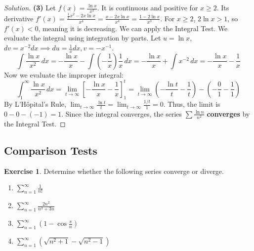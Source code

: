\documentclass[11pt]{article}
\theoremstyle{definition}
\newtheorem{exercise}{Exercise}[section]
\newenvironment{solution}{\begin{proof}[Solution]}{\end{proof}}
\begin{document}
\begin{solution}
\textbf{(3)} Let $f(x) = \frac{\ln x}{x^2}$. It is continuous and positive for $x \ge 2$. Its derivative $f'(x) = \frac{\frac{1}{x}x^2 - 2x\ln x}{x^4} = \frac{x - 2x\ln x}{x^4} = \frac{1 - 2\ln x}{x^3}$. For $x \ge 2$, $2\ln x > 1$, so $f'(x) < 0$, meaning it is decreasing. We can apply the Integral Test.
We evaluate the integral using integration by parts. Let $u=\ln x$, $dv=x^{-2}dx \implies du=\frac{1}{x}dx, v=-x^{-1}$.
\[
\int \frac{\ln x}{x^2} \,dx = -\frac{\ln x}{x} - \int \left(-\frac{1}{x}\right)\frac{1}{x} \,dx = -\frac{\ln x}{x} + \int x^{-2} \,dx = -\frac{\ln x}{x} - \frac{1}{x}
\]
Now we evaluate the improper integral:
\[
\int_1^\infty \frac{\ln x}{x^2} \,dx = \lim_{t \to \infty} \left[ -\frac{\ln x}{x} - \frac{1}{x} \right]_1^t = \lim_{t \to \infty} \left( -\frac{\ln t}{t} - \frac{1}{t} \right) - \left( -\frac{0}{1} - \frac{1}{1} \right)
\]
By L'Hôpital's Rule, $\lim_{t \to \infty} \frac{\ln t}{t} = \lim_{t \to \infty} \frac{1/t}{1} = 0$.
Thus, the limit is $0 - 0 - (-1) = 1$.
Since the integral converges, the series $\sum \frac{\ln n}{n^2}$ \textbf{converges} by the Integral Test.
\end{solution}

\subsection{Comparison Tests}

\begin{exercise}
Determine whether the following series converge or diverge.
\begin{enumerate}
    \item $\displaystyle \sum_{n=1}^{\infty} \frac{1}{n!}$
    \item $\displaystyle \sum_{n=1}^{\infty} \frac{2n^2}{n^3+3n}$
    \item $\displaystyle \sum_{n=1}^{\infty} \left(1-\cos \frac{\pi}{n}\right)$
    \item $\displaystyle \sum_{n=1}^{\infty} \left(\sqrt{n^2+1}-\sqrt{n^2-1}\right)$
\end{enumerate}
\end{exercise}
\end{document}
